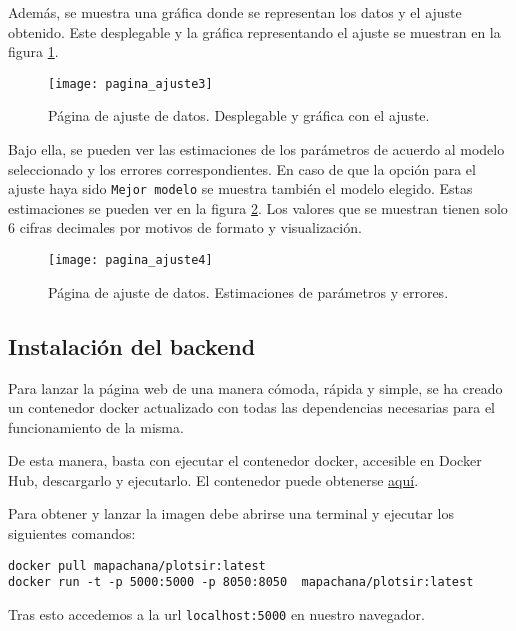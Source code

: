 Además, se muestra una gráfica donde se representan los datos y el ajuste obtenido. Este desplegable y la gráfica representando el ajuste se muestran en la figura \ref{manual: ajuste3}.

\begin{figure}
\begin{center}
\caption{Página de ajuste de datos. Desplegable y gráfica con el ajuste.}
\label{manual: ajuste3}
\texttt{[image: pagina\_ajuste3]}
\end{center}
\end{figure}

Bajo ella, se pueden ver las estimaciones de los parámetros de acuerdo al modelo seleccionado y los errores correspondientes. En caso de que la opción para el ajuste haya sido \verb|Mejor modelo| se muestra también el modelo elegido. Estas estimaciones se pueden ver en la figura \ref{manual: ajuste4}. Los valores que se muestran tienen solo 6 cifras decimales por motivos de formato y visualización.

\begin{figure}
\begin{center}
\caption{Página de ajuste de datos. Estimaciones de parámetros y errores.}
\label{manual: ajuste4}
\texttt{[image: pagina\_ajuste4]}
\end{center}
\end{figure}


\subsection{Instalación del backend}

Para lanzar la página web de una manera cómoda, rápida y simple, se ha creado un contenedor docker actualizado con todas las dependencias necesarias para el funcionamiento de la misma.

De esta manera, basta con ejecutar el contenedor docker, accesible en Docker Hub, descargarlo y ejecutarlo. El contenedor puede obtenerse \href{https://hub.docker.com/repository/docker/mapachana/plotsir}{aquí}.

Para obtener y lanzar la imagen debe abrirse una terminal y ejecutar los siguientes comandos:

\begin{verbatim}
docker pull mapachana/plotsir:latest
docker run -t -p 5000:5000 -p 8050:8050  mapachana/plotsir:latest
\end{verbatim}

Tras esto accedemos a la url \verb|localhost:5000| en nuestro navegador.


